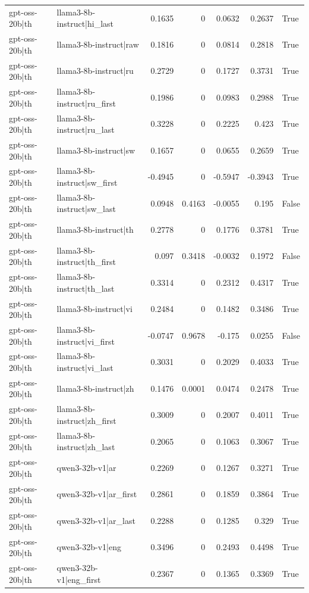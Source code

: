 \begin{table}
\begin{tabular}{l l r r r r l}
gpt-oss-20b|th & llama3-8b-instruct|hi_last & 0.1635 & 0 & 0.0632 & 0.2637 & True \\
gpt-oss-20b|th & llama3-8b-instruct|raw & 0.1816 & 0 & 0.0814 & 0.2818 & True \\
gpt-oss-20b|th & llama3-8b-instruct|ru & 0.2729 & 0 & 0.1727 & 0.3731 & True \\
gpt-oss-20b|th & llama3-8b-instruct|ru_first & 0.1986 & 0 & 0.0983 & 0.2988 & True \\
gpt-oss-20b|th & llama3-8b-instruct|ru_last & 0.3228 & 0 & 0.2225 & 0.423 & True \\
gpt-oss-20b|th & llama3-8b-instruct|sw & 0.1657 & 0 & 0.0655 & 0.2659 & True \\
gpt-oss-20b|th & llama3-8b-instruct|sw_first & -0.4945 & 0 & -0.5947 & -0.3943 & True \\
gpt-oss-20b|th & llama3-8b-instruct|sw_last & 0.0948 & 0.4163 & -0.0055 & 0.195 & False \\
gpt-oss-20b|th & llama3-8b-instruct|th & 0.2778 & 0 & 0.1776 & 0.3781 & True \\
gpt-oss-20b|th & llama3-8b-instruct|th_first & 0.097 & 0.3418 & -0.0032 & 0.1972 & False \\
gpt-oss-20b|th & llama3-8b-instruct|th_last & 0.3314 & 0 & 0.2312 & 0.4317 & True \\
gpt-oss-20b|th & llama3-8b-instruct|vi & 0.2484 & 0 & 0.1482 & 0.3486 & True \\
gpt-oss-20b|th & llama3-8b-instruct|vi_first & -0.0747 & 0.9678 & -0.175 & 0.0255 & False \\
gpt-oss-20b|th & llama3-8b-instruct|vi_last & 0.3031 & 0 & 0.2029 & 0.4033 & True \\
gpt-oss-20b|th & llama3-8b-instruct|zh & 0.1476 & 0.0001 & 0.0474 & 0.2478 & True \\
gpt-oss-20b|th & llama3-8b-instruct|zh_first & 0.3009 & 0 & 0.2007 & 0.4011 & True \\
gpt-oss-20b|th & llama3-8b-instruct|zh_last & 0.2065 & 0 & 0.1063 & 0.3067 & True \\
gpt-oss-20b|th & qwen3-32b-v1|ar & 0.2269 & 0 & 0.1267 & 0.3271 & True \\
gpt-oss-20b|th & qwen3-32b-v1|ar_first & 0.2861 & 0 & 0.1859 & 0.3864 & True \\
gpt-oss-20b|th & qwen3-32b-v1|ar_last & 0.2288 & 0 & 0.1285 & 0.329 & True \\
gpt-oss-20b|th & qwen3-32b-v1|eng & 0.3496 & 0 & 0.2493 & 0.4498 & True \\
gpt-oss-20b|th & qwen3-32b-v1|eng_first & 0.2367 & 0 & 0.1365 & 0.3369 & True \\

\end{tabular}
\end{table}
